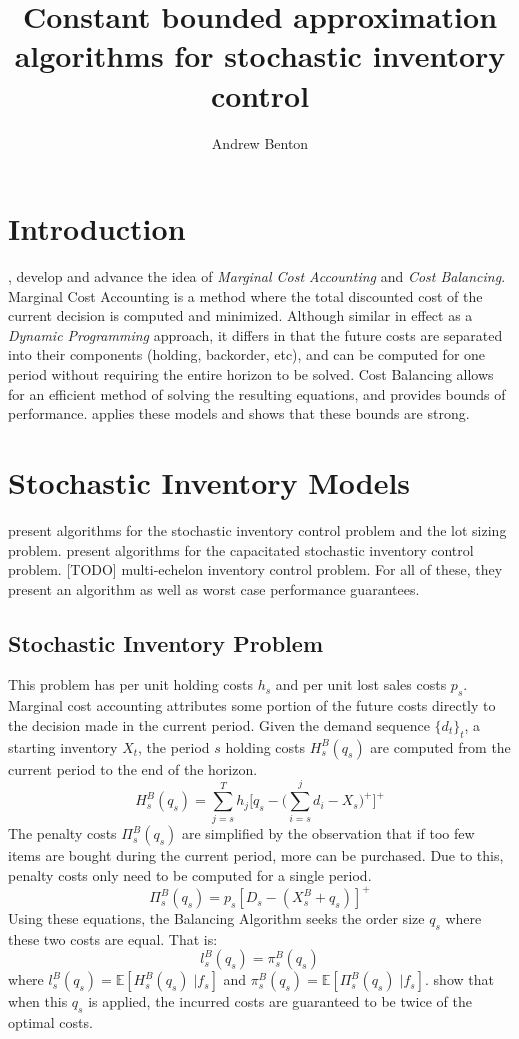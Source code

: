 \documentclass[12pt]{article}
\author{Andrew Benton}
\title{Constant bounded approximation algorithms for stochastic inventory control}
\newcommand{\EX}{\mathbb{E}}
\begin{document}
\maketitle

\section{Introduction}

\cite{levi:2007}, \cite{levi:2008} develop and advance the idea of \textit{Marginal Cost Accounting} and \textit{Cost Balancing}. Marginal Cost Accounting is a method where the total discounted cost of the current decision is computed and minimized. Although similar in effect as a \textit{Dynamic Programming} approach, it differs in that the future costs are separated into their components (holding, backorder, etc), and can be computed for one period without requiring the entire horizon to be solved. Cost Balancing allows for an efficient method of solving the resulting equations, and provides bounds of performance. \cite{hurley:2007} applies these models and shows that these bounds are strong.

\section{Stochastic Inventory Models}

\cite{levi:2007} present algorithms for the stochastic inventory control problem and the lot sizing problem. \cite{levi:2008} present algorithms for the capacitated stochastic inventory control problem. [TODO] multi-echelon inventory control problem. For all of these, they present an algorithm as well as worst case performance guarantees. 

\subsection{Stochastic Inventory Problem}

This problem has per unit holding costs $h_s$ and per unit lost sales costs $p_s$. Marginal cost accounting attributes some portion of the future costs directly to the decision made in the current period. Given the demand sequence $\{d_t\}_t$, a starting inventory $X_t$, the period $s$ holding costs $H^B_s(q_s)$ are computed from the current period to the end of the horizon. 
$$
	H_s^B(q_s) = \sum_{j=s}^T h_j \big[q_s - \big(\sum_{i=s}^j d_i - X_s\big)^+\big]^+
$$
The penalty costs $\Pi_s^B(q_s)$ are simplified by the observation that if too few items are bought during the current period, more can be purchased. Due to this, penalty costs only need to be computed for a single period.
$$
	\Pi_s^B(q_s) =  p_s [D_s - (X_s^B + q_s)]^+ 
$$
Using these equations, the Balancing Algorithm seeks the order size $q_s$ where these two costs are equal. That is:
$$
	l_s^B(q_s) = \pi_s^B(q_s)
$$
where $l_s^B(q_s) = \EX[H_s^B(q_s) \; | f_s]$ and $\pi_s^B(q_s) = \EX[\Pi_s^B(q_s) \; | f_s]$. \cite{levi:2007} show that when this $q_s$ is applied, the incurred costs are guaranteed to be twice of the optimal costs.  
\end{document}
